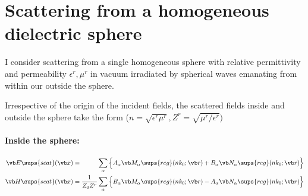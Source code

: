 \documentclass[letterpaper]{article}
\begin{document}
\section{Scattering from a homogeneous dielectric sphere}
\label{DielectricSphereScatteringSectionl}

I consider scattering from a single homogeneous sphere
with relative permittivity and permeability $\epsilon^r, \mu^r$
in vacuum
irradiated by spherical waves emanating from within our
outside the sphere.

Irrespective of the origin of the incident fields, 
the scattered fields inside and outside the sphere
take the form ($n=\sqrt{\epsilon^r \mu^r}, Z^r=\sqrt{\mu^r / \epsilon^r})$
\paragraph{Inside the sphere:} 
\begin{subequations}
\begin{align}
 \vb E\sups{scat}(\vb x)
 &=\hphantom{\frac{1}{Z_0 Z^r}}  \sum_\alpha 
     \Big\{ A_\alpha \vb M_\alpha\sups{reg}(nk_0; \vb r)
        +   B_\alpha \vb N_\alpha\sups{reg}(nk_0; \vb r)
     \Big\} 
\\
 \vb H\sups{scat}(\vb x)
 &= \frac{1}{Z_0 Z^r} \sum_\alpha 
     \Big\{ B_\alpha \vb M_\alpha\sups{reg}(nk_0; \vb r)
           -A_\alpha \vb N_\alpha\sups{reg}(nk_0; \vb r)
     \Big\} 
\end{align}
\label{EHScatInside}
\end{subequations}
\end{document}
